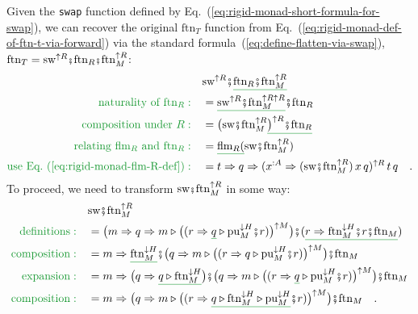 Given the \lstinline!swap!
function defined by Eq.~(\ref{eq:rigid-monad-short-formula-for-swap}),
we can recover the original $\text{ftn}_{T}$ function from Eq.~(\ref{eq:rigid-monad-def-of-ftn-t-via-forward})
via the standard formula~(\ref{eq:define-flatten-via-swap}), $\text{ftn}_{T}=\text{sw}^{\uparrow R}\bef\text{ftn}_{R}\bef\text{ftn}_{M}^{\uparrow R}$:
\begin{align}
 & \text{sw}^{\uparrow R}\bef\gunderline{\text{ftn}_{R}\bef\text{ftn}_{M}^{\uparrow R}}\nonumber \\
{\color{greenunder}\text{naturality of }\text{ftn}_{R}:}\quad & =\gunderline{\text{sw}^{\uparrow R}\bef\text{ftn}_{M}^{\uparrow R\uparrow R}}\bef\text{ftn}_{R}\nonumber \\
{\color{greenunder}\text{composition under }R:}\quad & =\big(\text{sw}\bef\text{ftn}_{M}^{\uparrow R}\gunderline{\big)^{\uparrow R}\bef\text{ftn}_{R}}\nonumber \\
{\color{greenunder}\text{relating }\text{flm}_{R}\text{ and }\text{ftn}_{R}:}\quad & =\gunderline{\text{flm}_{R}(}\text{sw}\bef\text{ftn}_{M}^{\uparrow R})\nonumber \\
{\color{greenunder}\text{use Eq.~(\ref{eq:rigid-monad-flm-R-def})}:}\quad & =t\Rightarrow q\Rightarrow(x^{:A}\Rightarrow(\text{sw}\bef\text{ftn}_{M}^{\uparrow R})\,x\,q)^{\uparrow R}\,t\,q\quad.\label{eq:rigid-monad-swap-ftn-derivation-4a}
\end{align}
To proceed, we need to transform $\text{sw}\bef\text{ftn}_{M}^{\uparrow R}$
in some way:
\begin{align}
 & \text{sw}\bef\text{ftn}_{M}^{\uparrow R}\nonumber \\
{\color{greenunder}\text{definitions}:}\quad & =\big(m\Rightarrow q\Rightarrow m\triangleright\big((r\Rightarrow\gunderline q\triangleright\text{pu}_{M}^{\downarrow H}\bef r)\big)^{\uparrow M}\big)\bef(\gunderline{r\Rightarrow\text{ftn}_{M}^{\downarrow H}\bef r\bef\text{ftn}_{M}})\nonumber \\
{\color{greenunder}\text{composition}:}\quad & =m\Rightarrow\gunderline{\text{ftn}_{M}^{\downarrow H}}\bef\big(q\Rightarrow m\triangleright\big((r\Rightarrow q\triangleright\text{pu}_{M}^{\downarrow H}\bef r)\big)^{\uparrow M}\big)\bef\text{ftn}_{M}\nonumber \\
{\color{greenunder}\text{expansion}:}\quad & =m\Rightarrow\big(q\Rightarrow\gunderline{q\triangleright\text{ftn}_{M}^{\downarrow H}}\big)\bef\big(q\Rightarrow m\triangleright\big((r\Rightarrow\gunderline q\triangleright\text{pu}_{M}^{\downarrow H}\bef r)\big)^{\uparrow M}\big)\bef\text{ftn}_{M}\nonumber \\
{\color{greenunder}\text{composition}:}\quad & =m\Rightarrow\big(q\Rightarrow m\triangleright\big((r\Rightarrow\gunderline{q\triangleright\text{ftn}_{M}^{\downarrow H}\triangleright\text{pu}_{M}^{\downarrow H}}\bef r)\big)^{\uparrow M}\big)\bef\text{ftn}_{M}\quad.\label{eq:rigid-monad-swap-ftn-derivation4}
\end{align}
